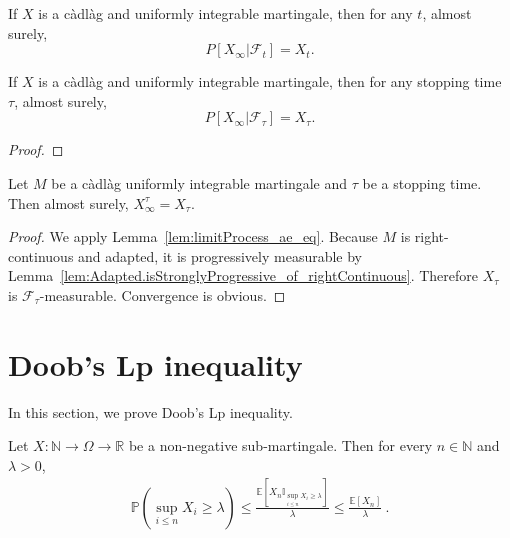 \begin{theorem}\label{thm:condExp_limitProcess}
  \leanok
  If $X$ is a càdlàg and uniformly integrable martingale, then for any $t$, almost surely,
  $$P[X_\infty | \mathcal{F}_t] = X_t.$$
\end{theorem}


\begin{theorem}\label{thm:condExp_limitProcess_stopped}
  \leanok
  If $X$ is a càdlàg and uniformly integrable martingale, then for any stopping time $\tau$, almost surely,
  $$P[X_\infty | \mathcal{F}_\tau] = X_\tau.$$
\end{theorem}

\begin{proof}

\end{proof}


\begin{lemma}\label{lem:limitProcess_stoppedProcess}
  \leanok
Let $M$ be a càdlàg uniformly integrable martingale and $\tau$ be a stopping time. Then almost surely, $X^\tau_\infty = X_\tau$.
\end{lemma}

\begin{proof}
  \leanok
We apply Lemma~\ref{lem:limitProcess_ae_eq}. Because $M$ is right-continuous and adapted, it is progressively measurable by Lemma~\ref{lem:Adapted.isStronglyProgressive_of_rightContinuous}. Therefore $X_\tau$ is $\mathcal{F}_\tau$-measurable. Convergence is obvious.
\end{proof}



\section{Doob's Lp inequality}

In this section, we prove Doob's Lp inequality.


\begin{lemma}\label{lem:maximal_ineq}
  \mathlibok
Let $X : \mathbb{N} \rightarrow \Omega \rightarrow \mathbb{R}$ be a non-negative sub-martingale.
Then for every $n \in \mathbb{N}$ and $\lambda > 0$,
\begin{align*}
  \mathbb{P}\left(\sup_{i \le n}X_i\geq\lambda \right)
  \le \frac{\mathbb{E}\left[X_n \mathbb{I}_{\sup_{i \le n}X_i \ge \lambda}\right]}{\lambda}
  \le \frac{\mathbb{E}[X_n]}{\lambda}
  \: .
\end{align*}
\end{lemma}

